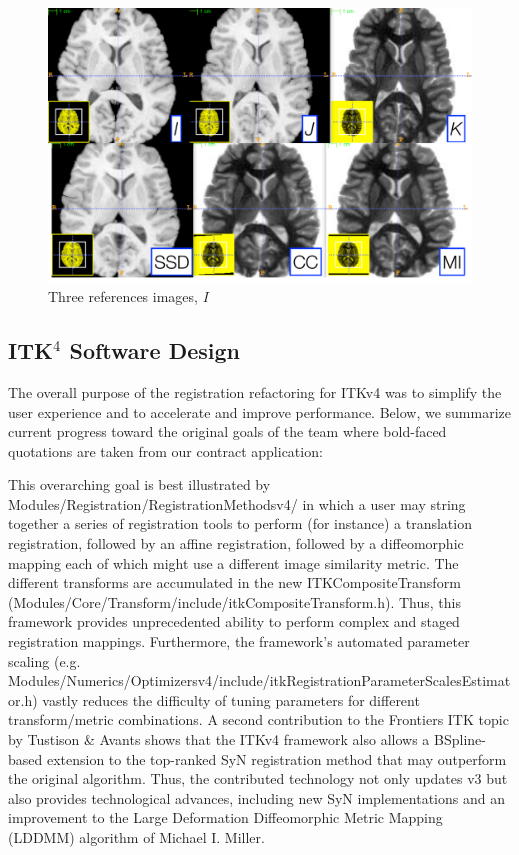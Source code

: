\documentclass{frontiersSCNS}
\begin{document}
\begin{figure}[t]
\begin{center}
\includegraphics[width=4.5in]{figs/three.pdf}
\caption{\baselineskip 12pt \small Three references images, $I$}
\end{center}
\end{figure}

\subsection{ITK$^4$ Software Design}
The overall purpose of the registration refactoring for ITKv4 was to simplify the user experience and to accelerate and improve performance. Below, we summarize current progress toward the original goals of the team where bold-faced quotations are taken from our contract application:

This overarching goal is best illustrated by
Modules/Registration/RegistrationMethodsv4/ in which a user may string
together a series of registration tools to perform (for instance) a
translation registration, followed by an affine registration, followed
by a diffeomorphic mapping each of which might use a different image
similarity metric.  The different transforms are accumulated in the
new ITKCompositeTransform
(Modules/Core/Transform/include/itkCompositeTransform.h).  Thus, this
framework provides unprecedented ability to perform complex and staged
registration mappings.  Furthermore, the framework’s automated
parameter scaling
(e.g. Modules/Numerics/Optimizersv4/include/itkRegistrationParameterScalesEstimator.h)
vastly reduces the difficulty of tuning parameters for different
transform/metric combinations.  A second contribution to the Frontiers
ITK topic by Tustison \& Avants shows that the ITKv4 framework also allows a BSpline-based extension to the top-ranked SyN registration method that may outperform the original algorithm.  Thus, the contributed technology not only updates v3 but also provides technological advances, including new SyN implementations and an improvement to the Large Deformation Diffeomorphic Metric Mapping (LDDMM) algorithm of Michael I. Miller.  
\end{document}
